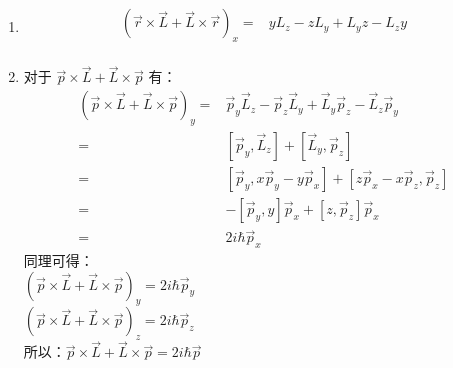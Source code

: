 \subsection{ }
\begin{enumerate}
\item 
\begin{equation}
\begin{aligned}
(\vec{r} \times \vec{L} + \vec{L} \times \vec{r})_{x} =& yL_{z}-zL_{y}+L_{y}z-L_{z}y \\
\end{aligned}
\end{equation}
\item 对于 $\vec{p} \times \vec{L} + \vec{L} \times \vec{p}$ 有：
\begin{equation}
\begin{aligned}
(\vec{p} \times \vec{L} + \vec{L} \times \vec{p})_{y} =& \vec{p}_{y} \vec{L}_{z} - \vec{p}_{z} \vec{L}_{y} + \vec{L}_{y} \vec{p}_{z} - \vec{L}_{z} \vec{p}_{y} \\
=& [\vec{p}_{y},\vec{L}_{z}] + [\vec{L}_{y},\vec{p}_{z}] \\
=& [\vec{p}_{y},x\vec{p}_{y} - y\vec{p}_{x}] + [z\vec{p}_{x}-x\vec{p}_{z},\vec{p}_{z}] \\
=& -[\vec{p}_{y},y]\vec{p}_{x} + [z,\vec{p}_{z}]\vec{p}_{x} \\
=& 2i\hbar \vec{p}_{x}
\end{aligned}
\end{equation}
同理可得：\\
$(\vec{p} \times \vec{L} + \vec{L} \times \vec{p})_{y} =2i\hbar \vec{p}_{y} $ \\
$(\vec{p} \times \vec{L} + \vec{L} \times \vec{p})_{z} =2i\hbar \vec{p}_{z} $ \\
所以：$\vec{p} \times \vec{L} + \vec{L} \times \vec{p} = 2i\hbar \vec{p} $
\end{enumerate}

